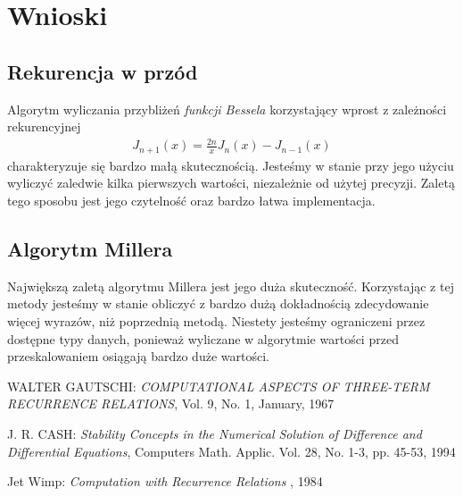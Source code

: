 \documentclass{article}
\begin{document}
\section{Wnioski}
\subsection{Rekurencja w przód}
Algorytm wyliczania przybliżeń \textit{funkcji Bessela} korzystający wprost z zależności rekurencyjnej
\begin{align*}
J_{n+ 1}(x) = \frac{2n}{x}J_n(x) - J_{n - 1}(x) \tag*{(n = 1, 2,..).}
\end{align*}
charakteryzuje się bardzo małą skutecznością. Jesteśmy w stanie przy jego użyciu wyliczyć zaledwie kilka pierwszych wartości, niezależnie od użytej precyzji. Zaletą tego sposobu jest jego czytelność oraz bardzo łatwa implementacja.
\subsection{Algorytm Millera}
Największą zaletą algorytmu Millera jest jego duża skuteczność. Korzystając z tej metody jesteśmy w stanie obliczyć z bardzo dużą dokładnością zdecydowanie więcej wyrazów, niż poprzednią metodą. Niestety jesteśmy ograniczeni przez dostępne typy danych, ponieważ wyliczane w algorytmie wartości przed przeskalowaniem osiągają bardzo duże wartości.

\begin{thebibliography}{99}
 WALTER GAUTSCHI:
\emph{COMPUTATIONAL ASPECTS OF THREE-TERM RECURRENCE
RELATIONS},
Vol. 9, No. 1, January, 1967

 J. R. CASH:
\emph{Stability Concepts in the
Numerical Solution of
Difference and Differential Equations},
Computers Math. Applic. Vol. 28, No. 1-3, pp. 45-53, 1994

 Jet Wimp:
\emph{Computation with Recurrence Relations },
1984
\end{thebibliography}
\end{document}
